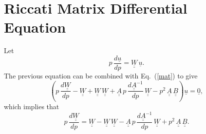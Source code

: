 \documentclass[12pt,prb,aps,notitlepage]{revtex4-1}
\begin{document}
\section{Riccati Matrix Differential Equation}
Let
\begin{equation}\label{wdef}
 p\,\frac{d\underline{u}}{dp}=\underline{\underline{W}}\,\underline{u}.
\end{equation}
The previous equation can be combined with Eq.~(\ref{mat}) to give 
\begin{equation}
\left(p\,\frac{d\underline{\underline{W}}}{dp} - \underline{\underline{W}} 
+ \underline{\underline{W}}\,\underline{\underline{W}} + \underline{\underline{A}}\,p\,\frac{d\underline{\underline{A}}^{-1}}{dp}\,\underline{\underline{W}}- p^2\,\underline{\underline{A}}\,\underline{\underline{B}}\right)\underline{u} = \underline{0},
\end{equation}
which implies that 
\begin{equation}\label{eq96}
p\,\frac{d\underline{\underline{W}}}{dp} = \underline{\underline{W}} - \underline{\underline{W}}\,\underline{\underline{W}} - \underline{\underline{A}}\,p\,\frac{d\underline{\underline{A}}^{-1}}{dp}\,\underline{\underline{W}}
+ p^2\,\underline{\underline{A}}\,\underline{\underline{B}}.
\end{equation}
\end{document}
